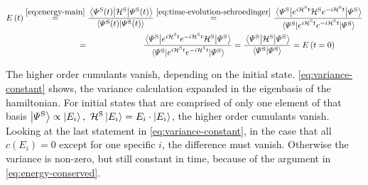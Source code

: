 \begin{equation}
    \label{eq:energy-conserved}
    \begin{split}
        \energyOft &\stackrel{\ref{eq:energy-main}}{=}
        \frac{\bracketHelper{\psiOfT[\schroedingerPicture]}{\pictureHamiltonian[\schroedingerPicture]}{\psiOfT[\schroedingerPicture]}}{\braketHelper{\psiOfT[\schroedingerPicture]}{\psiOfT[\schroedingerPicture]}}
        \stackrel{\ref{eq:time-evolution-schroedinger}}{=}
        \frac{\bracketHelper{\picturePsi[\schroedingerPicture]{}}{e^{i \pictureHamiltonian[\schroedingerPicture] t}{\pictureHamiltonian[\schroedingerPicture]}e^{-i \pictureHamiltonian[\schroedingerPicture] t}}{\picturePsi[\schroedingerPicture]{}}}{\bracketHelper{\picturePsi[\schroedingerPicture]{}}{e^{i \pictureHamiltonian[\schroedingerPicture] t}e^{-i \pictureHamiltonian[\schroedingerPicture] t}}{\picturePsi[\schroedingerPicture]{}}}\\
        &\stackrel{\phantom{\ref{eq:time-evolution-schroedinger}}}{=}
        \frac{\bracketHelper{\picturePsi[\schroedingerPicture]{}}{e^{i \pictureHamiltonian[\schroedingerPicture] t}e^{-i \pictureHamiltonian[\schroedingerPicture] t}{\pictureHamiltonian[\schroedingerPicture]}}{\picturePsi[\schroedingerPicture]{}}}{\bracketHelper{\picturePsi[\schroedingerPicture]{}}{e^{i \pictureHamiltonian[\schroedingerPicture] t}e^{-i \pictureHamiltonian[\schroedingerPicture] t}}{\picturePsi[\schroedingerPicture]{}}} = 
        \frac{\bracketHelper{\picturePsi[\schroedingerPicture]{}}{\pictureHamiltonian[\schroedingerPicture]}{\picturePsi[\schroedingerPicture]{}}}{\braketHelper{\picturePsi[\schroedingerPicture]{}}{\picturePsi[\schroedingerPicture]{}}}
         = \energyOft[t=0]
    \end{split}
\end{equation}

The higher order cumulants vanish, depending on the initial state. 
\autoref{eq:variance-constant} shows, the variance calculation expanded in the eigenbasis of the hamiltonian.
For initial states that are comprised of only one element of that basis $\ketN[{\picturePsi[\schroedingerPicture]{}}] \propto \ketN[E_i],\,\,\pictureHamiltonian[\schroedingerPicture]\ketN[E_i] = E_i\cdot\ketN[E_i]$, the higher order cumulants vanish. 
Looking at the last statement in \autoref{eq:variance-constant}, in the case that all $c(E_i) = 0$ except for one specific $i$, the difference must vanish.
Otherwise the variance is non-zero, but still constant in time, because of the argument in \autoref{eq:energy-conserved}.

